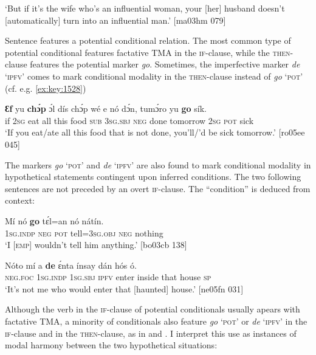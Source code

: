 \glt ‘But if it’s the wife who’s an influential woman, your [her] husband
doesn’t [automatically] turn into an influential man.’ [ma03hm 079]
\z

Sentence  features a potential conditional relation. The most common type of potential conditional features factative TMA in the \textsc{if-}clause, while the \textsc{then-}clause features the potential marker \textit{go}. Sometimes, the imperfective marker \textit{de} ‘\textsc{ipfv’} comes to mark conditional modality in the \textsc{then-}clause instead of \textit{go} \textsc{‘pot’} (cf. e.g. \ref{ex:key:1528})


\ea%
    \label{ex:key:1524}
    \gll \textbf{Ɛf}  yu  \textbf{chɔ́p}  ɔ́l  dís  chɔ́p  wé  e    nó  dɔ́n,
tumɔ́ro    yu  \textbf{go}  sík.\\
if  \textsc{2sg}  eat    all  this  food    \textsc{sub}  \textsc{3sg.sbj}  \textsc{neg}  done
tomorrow  \textsc{2sg}  \textsc{pot}  sick\\

\glt ‘If you eat/ate all this food that is not done, you’ll/’d be
sick tomorrow.’ [ro05ee 045]
\z

The markers \textit{go} ‘\textsc{pot}’  and \textit{de} ‘\textsc{ipfv’}  are also found to mark conditional modality in hypothetical statements contingent upon inferred conditions. The two following sentences are not preceded by an overt \textsc{if-}clause. The “condition” is deduced from context: 


\ea%
    \label{ex:key:1525}
    \gll Mí    nó  \textbf{go}  tɛ́l=an    nó  nátín.\\
\textsc{1sg.indp}  \textsc{neg}  \textsc{pot}  tell=\textsc{3sg.obj}  \textsc{neg}  nothing\\

\glt ‘I \textsc{[emp]} wouldn’t tell him anything.’ [bo03cb 138]
\z


\ea%
    \label{ex:key:1526}
    \gll Nóto  mí    a    \textbf{de}  ɛ́nta    ínsay  dán  hós    ó.\\
\textsc{neg}.\textsc{foc}  \textsc{1sg.indp}  \textsc{1sg.sbj}  \textsc{ipfv}  enter  inside  that  house  \textsc{sp}\\

\glt ‘It’s not me who would enter that [haunted] house.’ [ne05fn 031]
\z

Although the verb in the \textsc{if-}clause of potential conditionals usually apears with factative TMA, a minority of conditionals also feature \textit{go} ‘\textsc{pot}’ or \textit{de} ‘\textsc{ipfv}’ in the \textsc{if-}clause and in the \textsc{then-}clause, as in  and . I interpret this use as instances of modal harmony between the two hypothetical situations:


